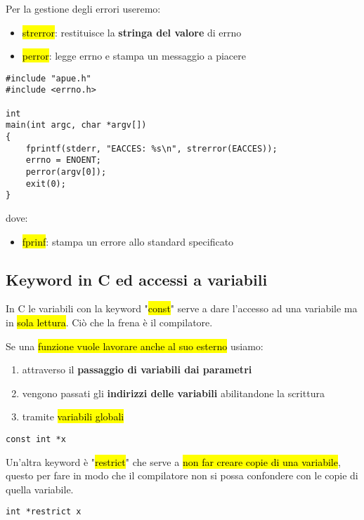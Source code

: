 Per la gestione degli errori useremo:

\begin{itemize}
	\item \hl{strerror}: restituisce la \textbf{stringa del valore} di errno
	\item \hl{perror}: legge errno e stampa un messaggio a piacere
\end{itemize}


\begin{lstlisting}
#include "apue.h"
#include <errno.h>

int
main(int argc, char *argv[])
{
	fprintf(stderr, "EACCES: %s\n", strerror(EACCES));
	errno = ENOENT;
	perror(argv[0]);
	exit(0);
}
\end{lstlisting}


dove:

\begin{itemize}
	\item \hl{fprinf}: stampa un errore allo standard specificato
\end{itemize}


\subsection{Keyword in C ed accessi a variabili}

In C le variabili con la keyword "\hl{const}" serve a dare l'accesso ad una variabile ma in \hl{sola lettura}. Ciò che la frena è il compilatore.

Se una \hl{funzione vuole lavorare anche al suo esterno} usiamo:

\begin{enumerate}
	\item attraverso il \textbf{passaggio di variabili dai parametri}
	\item vengono passati gli \textbf{indirizzi delle variabili} abilitandone la scrittura
	\item tramite \hl{variabili globali}
\end{enumerate}

\begin{lstlisting}
const int *x
\end{lstlisting}

Un'altra keyword è "\hl{restrict}" che serve a \hl{non far creare copie di una variabile}, questo per fare in modo che il compilatore non si possa confondere con le copie di quella variabile.

\begin{lstlisting}
int *restrict x
\end{lstlisting}


